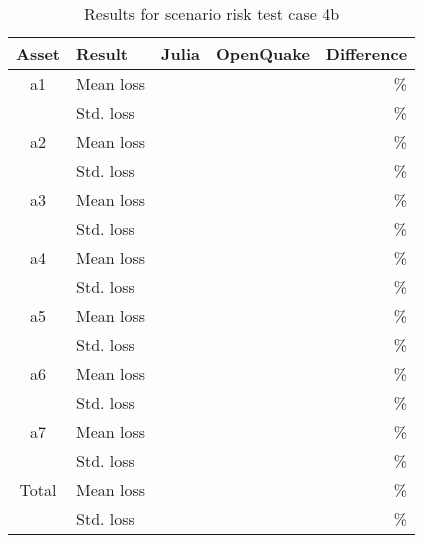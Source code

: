 \begin{table}[htbp]

\centering
\begin{tabular}{ c l r r r }

\hline
\rowcolor{anti-flashwhite}
\bf{Asset} & \bf{Result} & \bf{Julia} & \bf{OpenQuake} & \bf{Difference}\\
\hline
a1 & Mean loss &  &  & \% \\
 & Std. loss &  &  & \% \\
\hline
a2 & Mean loss &  &  & \% \\
 & Std. loss &  &  & \% \\
\hline
a3 & Mean loss &  &  & \% \\
 & Std. loss &  &  & \% \\
\hline
a4 & Mean loss &  &  & \% \\
 & Std. loss &  &  & \% \\
\hline
a5 & Mean loss &  &  & \% \\
 & Std. loss &  &  & \% \\
\hline
a6 & Mean loss &  &  & \% \\
 & Std. loss &  &  & \% \\
\hline
a7 & Mean loss &  &  & \% \\
 & Std. loss &  &  & \% \\
\hline
Total & Mean loss &  &  & \% \\
 & Std. loss &  &  & \% \\
\hline
\end{tabular}

\caption{Results for scenario risk test case 4b}
\label{tab:result-sr-4b}
\end{table}
